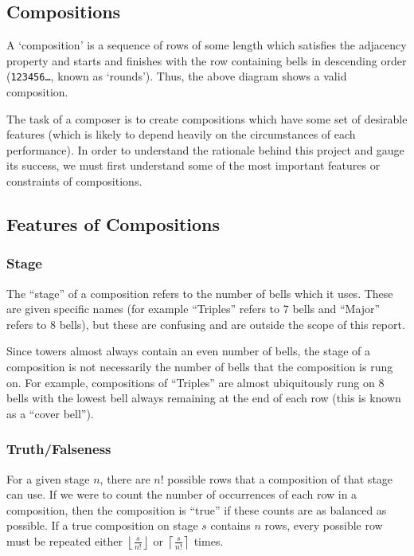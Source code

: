\documentclass[12pt]{article}
\newcommand{\row}[1]{\texttt{#1}}
\begin{document}
\subsection{Compositions}

A `composition' is a sequence of rows of some length which satisfies the adjacency property and
starts and finishes with the row containing bells in descending order (\row{123456\ldots}, known as
`rounds').  Thus, the above diagram shows a valid composition.

The task of a composer is to create compositions which have some set of desirable features (which is
likely to depend heavily on the circumstances of each performance).  In order to understand the
rationale behind this project and gauge its success, we must first understand some of the most
important features or constraints of compositions.

\subsection{Features of Compositions}

\subsubsection{Stage}

The ``stage'' of a composition refers to the number of bells which it uses.  These are given
specific names (for example ``Triples'' refers to 7 bells and ``Major'' refers to 8 bells), but
these are confusing and are outside the scope of this report.

Since towers almost always contain an even number of bells, the stage of a composition is not
necessarily the number of bells that the composition is rung on.  For example, compositions of
``Triples'' are almost ubiquitously rung on 8 bells with the lowest bell always remaining at the end
of each row (this is known as a ``cover bell'').

\subsubsection{Truth/Falseness}

For a given stage $n$, there are $n!$ possible rows that a composition of that stage can use.  If we
were to count the number of occurrences of each row in a composition, then the composition is
``true'' if these counts are as balanced as possible.  If a true composition on stage $s$ contains
$n$ rows, every possible row must be repeated either $\left\lfloor \frac{s}{n!} \right\rfloor$ or
$\left\lceil \frac{s}{n!} \right\rceil$ times.
\end{document}
